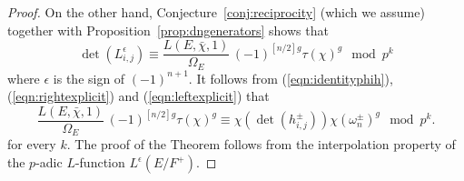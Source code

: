 \documentclass[12pt]{amsart}
\numberwithin{equation}{section}
\begin{document}
\begin{proof}
On the other hand, Conjecture~\ref{conj:reciprocity} (which we assume) together with Proposition~\ref{prop:dngenerators} shows that
\begin{equation}
\label{eqn:leftexplicit}
\det\left(L_{i,j}^\epsilon\right)\equiv \frac{L(E,\bar{\chi},1)}{\Omega_E}\,(-1)^{[n/2]g}\tau(\chi)^g \mod p^k
\end{equation}
where $\epsilon$ is the sign of $(-1)^{n+1}$. It follows from (\ref{eqn:identityphih}), (\ref{eqn:rightexplicit}) and (\ref{eqn:leftexplicit}) that
$$\frac{L(E,\bar{\chi},1)}{\Omega_E}\,(-1)^{[n/2]g}\tau(\chi)^g \equiv \chi\left(\det\left(h_{i,j}^{\pm}\right)\right)\chi(\omega_n^\pm)^g \mod p^k.$$
for every $k$. The proof of the Theorem follows from the interpolation property of the $p$-adic $L$-function $L^\epsilon(E/F^+)$.
\end{proof}
\end{document}
